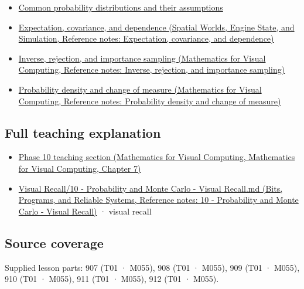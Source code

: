 \begin{itemize}
\tightlist
\item
  \hyperref[appendix-a2360b435383]{Common probability distributions and their assumptions}
\item
  \href{../05-Spatial-Worlds-Engine-State-and-Simulation/main.pdf\#nameddest=appendix-54c383df9992}{Expectation, covariance, and dependence (Spatial Worlds, Engine State, and Simulation, Reference notes: Expectation, covariance, and dependence)}
\item
  \href{../02-Mathematics-for-Visual-Computing/main.pdf\#nameddest=appendix-8d863ed954d0}{Inverse, rejection, and importance sampling (Mathematics for Visual Computing, Reference notes: Inverse, rejection, and importance sampling)}
\item
  \href{../02-Mathematics-for-Visual-Computing/main.pdf\#nameddest=appendix-4815cd87ab8b}{Probability density and change of measure (Mathematics for Visual Computing, Reference notes: Probability density and change of measure)}
\end{itemize}

\subsection{Full teaching explanation}\label{appendix-4d0203f7944f-full-teaching-explanation}

\begin{itemize}
\tightlist
\item
  \href{../02-Mathematics-for-Visual-Computing/main.pdf\#nameddest=02-foundations-ii-ch023-random-quantities-and-their-probability-laws}{Phase 10 teaching section (Mathematics for Visual Computing, Mathematics for Visual Computing, Chapter 7)}
\item
  \href{../01-Bits-Programs-and-Reliable-Systems/main.pdf\#nameddest=appendix-cb5af353ef77}{Visual Recall/10 - Probability and Monte Carlo - Visual Recall.md (Bits, Programs, and Reliable Systems, Reference notes: 10 - Probability and Monte Carlo - Visual Recall)} · visual recall
\end{itemize}

\subsection{Source coverage}\label{appendix-4d0203f7944f-source-coverage}

Supplied lesson parts: 907 (T01 · M055), 908 (T01 · M055), 909 (T01 · M055), 910 (T01 · M055), 911 (T01 · M055), 912 (T01 · M055).
